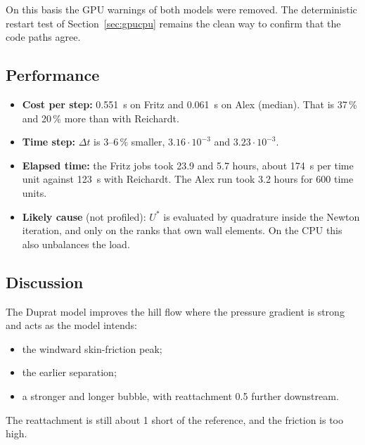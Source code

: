 \documentclass[11pt,a4paper]{article}
\begin{document}
\noindent On this basis the GPU warnings of both models were removed. The
deterministic restart test of Section~\ref{sec:gpucpu} remains the clean way
to confirm that the code paths agree.

\subsection{Performance}

\begin{itemize}
  \item \textbf{Cost per step:} 0.551~s on Fritz and 0.061~s on Alex
    (median). That is 37\,\% and 20\,\% more than with Reichardt.
  \item \textbf{Time step:} $\Delta t$ is 3--6\,\% smaller,
    $3.16\cdot10^{-3}$ and $3.23\cdot10^{-3}$.
  \item \textbf{Elapsed time:} the Fritz jobs took 23.9 and 5.7 hours, about
    174~s per time unit against 123~s with Reichardt. The Alex run took
    3.2 hours for 600 time units.
  \item \textbf{Likely cause} (not profiled): $U^*$ is evaluated by
    quadrature inside the Newton iteration, and only on the ranks that own
    wall elements. On the CPU this also unbalances the load.
\end{itemize}

\subsection{Discussion}
\label{sec:hilldup-disc}

The Duprat model improves the hill flow where the pressure gradient is
strong and acts as the model intends:
\begin{itemize}
  \item the windward skin-friction peak;
  \item the earlier separation;
  \item a stronger and longer bubble, with reattachment 0.5 further
    downstream.
\end{itemize}
The reattachment is still about 1 short of the reference, and the friction
is too high.
\end{document}
